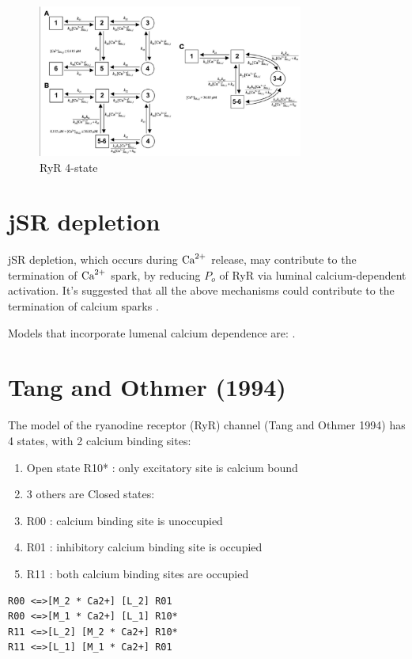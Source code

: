 \begin{figure}[hbt]
  \centerline{\includegraphics[height=5cm]{./images/greenstein_RyR.eps}}
\caption{RyR 4-state}
\label{fig:greenstein_RyR}
\end{figure}




\section{jSR depletion}

jSR depletion, which occurs during ${\text{Ca}^{2+}}$ release, may contribute to the
termination of ${\text{Ca}^{2+}}$ spark, by reducing $P_o$ of RyR via luminal
calcium-dependent activation. It's suggested that all the
above mechanisms could contribute to the termination of calcium sparks
\citep{sobie2002tcas}.

Models that incorporate lumenal calcium dependence are:
\citep{sobie2002tcas, williams2008mclc, williams2011}.



\section{Tang and Othmer (1994)}

The model of the ryanodine receptor (RyR) channel (Tang
and Othmer 1994) has 4 states, with 2 calcium binding sites:
\begin{enumerate}
  \item Open state R10* : only excitatory site is calcium bound
  
  \item 3 others are Closed states:
  \item R00 : calcium binding site is unoccupied
  \item R01 : inhibitory calcium binding site is occupied
  \item R11 : both calcium binding sites are occupied
\end{enumerate}

\begin{verbatim}
R00 <=>[M_2 * Ca2+] [L_2] R01 
R00 <=>[M_1 * Ca2+] [L_1] R10*
R11 <=>[L_2] [M_2 * Ca2+] R10*
R11 <=>[L_1] [M_1 * Ca2+] R01	
\end{verbatim}


